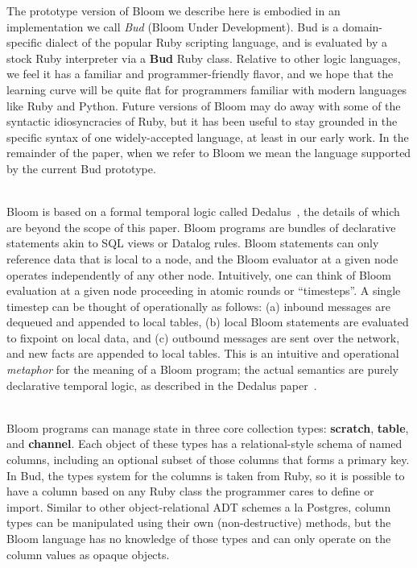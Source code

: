 The prototype version of Bloom we describe here is embodied in an implementation we call {\em Bud} (Bloom Under Development).  Bud is a domain-specific dialect of the popular Ruby scripting language, and is evaluated by a stock Ruby interpreter via a {\bf Bud} Ruby class.  Relative to other logic languages, we feel it has a familiar and programmer-friendly flavor, and we hope that the learning curve will be quite flat for programmers familiar with modern languages like Ruby and Python.  Future versions of Bloom may do away with some of the syntactic idiosyncracies of Ruby, but it has been useful to stay grounded in the specific syntax of one widely-accepted language, at least in our early work.  In the remainder of the paper, when we refer to Bloom we mean the language supported by the current Bud prototype.

\\
\noindent
Bloom is based on a formal temporal logic called Dedalus~\cite{dedalus}, the details of which are beyond the scope of this paper.  Bloom programs are bundles of declarative statements akin to SQL views or Datalog rules.  Bloom statements can only reference data that is local to a node, and the Bloom evaluator at a given node operates independently of any other node.  Intuitively, one can think of Bloom evaluation at a given node proceeding in atomic rounds or ``timesteps''.   A single timestep can be thought of operationally as follows: (a) inbound messages are dequeued and appended to local tables, (b) local Bloom statements are evaluated to fixpoint on local data, and (c) outbound messages are sent over the network, and new facts are appended to local tables.  This is an intuitive and operational {\em metaphor} for the meaning of a Bloom program; the actual semantics are purely declarative temporal logic, as described in the Dedalus paper~\cite{dedalus}.

\\
\noindent
Bloom programs can manage state in three core collection types: {\bf scratch}, {\bf table}, and {\bf channel}. Each object of these types has a relational-style schema of named columns, including an optional subset of those columns that forms a primary key.  In Bud, the types system for the columns is taken from Ruby, so it is possible to have a column based on any Ruby class the programmer cares to define or import.  Similar to other object-relational ADT schemes a la Postgres, column types can be manipulated using their own (non-destructive) methods, but the Bloom language has no knowledge of those types and can only operate on the column values as opaque objects.  

